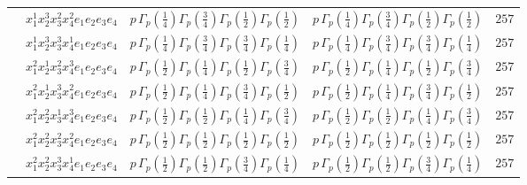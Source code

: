 \documentclass[11pt]{article}
\begin{document}
\begin{table}[ht]
{\begin{tabular}{@{}lllll@{}}
 & $x_{1}^{1} x_{2}^{3} x_{3}^{2} x_{4}^{2}  e_{1} e_{2} e_{3} e_{4}$ & $p \, \Gamma_p \left( \frac{1}{4} \right) \Gamma_p \left( \frac{3}{4} \right) \Gamma_p \left( \frac{1}{2} \right) \Gamma_p \left( \frac{1}{2} \right)$ & $p \, \Gamma_p \left( \frac{1}{4} \right) \Gamma_p \left( \frac{3}{4} \right) \Gamma_p \left( \frac{1}{2} \right) \Gamma_p \left( \frac{1}{2} \right)$ & $257$ \\
 & $x_{1}^{1} x_{2}^{3} x_{3}^{3} x_{4}^{1}  e_{1} e_{2} e_{3} e_{4}$ & $p \, \Gamma_p \left( \frac{1}{4} \right) \Gamma_p \left( \frac{3}{4} \right) \Gamma_p \left( \frac{3}{4} \right) \Gamma_p \left( \frac{1}{4} \right)$ & $p \, \Gamma_p \left( \frac{1}{4} \right) \Gamma_p \left( \frac{3}{4} \right) \Gamma_p \left( \frac{3}{4} \right) \Gamma_p \left( \frac{1}{4} \right)$ & $257$ \\
 & $x_{1}^{2} x_{2}^{1} x_{3}^{2} x_{4}^{3}  e_{1} e_{2} e_{3} e_{4}$ & $p \, \Gamma_p \left( \frac{1}{2} \right) \Gamma_p \left( \frac{1}{4} \right) \Gamma_p \left( \frac{1}{2} \right) \Gamma_p \left( \frac{3}{4} \right)$ & $p \, \Gamma_p \left( \frac{1}{2} \right) \Gamma_p \left( \frac{1}{4} \right) \Gamma_p \left( \frac{1}{2} \right) \Gamma_p \left( \frac{3}{4} \right)$ & $257$ \\
 & $x_{1}^{2} x_{2}^{1} x_{3}^{3} x_{4}^{2}  e_{1} e_{2} e_{3} e_{4}$ & $p \, \Gamma_p \left( \frac{1}{2} \right) \Gamma_p \left( \frac{1}{4} \right) \Gamma_p \left( \frac{3}{4} \right) \Gamma_p \left( \frac{1}{2} \right)$ & $p \, \Gamma_p \left( \frac{1}{2} \right) \Gamma_p \left( \frac{1}{4} \right) \Gamma_p \left( \frac{3}{4} \right) \Gamma_p \left( \frac{1}{2} \right)$ & $257$ \\
 & $x_{1}^{2} x_{2}^{2} x_{3}^{1} x_{4}^{3}  e_{1} e_{2} e_{3} e_{4}$ & $p \, \Gamma_p \left( \frac{1}{2} \right) \Gamma_p \left( \frac{1}{2} \right) \Gamma_p \left( \frac{1}{4} \right) \Gamma_p \left( \frac{3}{4} \right)$ & $p \, \Gamma_p \left( \frac{1}{2} \right) \Gamma_p \left( \frac{1}{2} \right) \Gamma_p \left( \frac{1}{4} \right) \Gamma_p \left( \frac{3}{4} \right)$ & $257$ \\
 & $x_{1}^{2} x_{2}^{2} x_{3}^{2} x_{4}^{2}  e_{1} e_{2} e_{3} e_{4}$ & $p \, \Gamma_p \left( \frac{1}{2} \right) \Gamma_p \left( \frac{1}{2} \right) \Gamma_p \left( \frac{1}{2} \right) \Gamma_p \left( \frac{1}{2} \right)$ & $p \, \Gamma_p \left( \frac{1}{2} \right) \Gamma_p \left( \frac{1}{2} \right) \Gamma_p \left( \frac{1}{2} \right) \Gamma_p \left( \frac{1}{2} \right)$ & $257$ \\
 & $x_{1}^{2} x_{2}^{2} x_{3}^{3} x_{4}^{1}  e_{1} e_{2} e_{3} e_{4}$ & $p \, \Gamma_p \left( \frac{1}{2} \right) \Gamma_p \left( \frac{1}{2} \right) \Gamma_p \left( \frac{3}{4} \right) \Gamma_p \left( \frac{1}{4} \right)$ & $p \, \Gamma_p \left( \frac{1}{2} \right) \Gamma_p \left( \frac{1}{2} \right) \Gamma_p \left( \frac{3}{4} \right) \Gamma_p \left( \frac{1}{4} \right)$ & $257$ \\

\end{tabular}}
\end{table}
\end{document}

